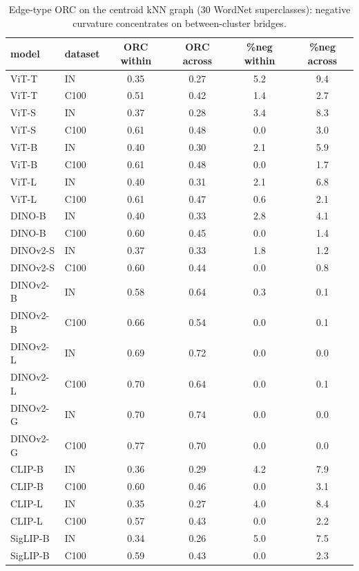 \begin{table}[H]
\centering
\small
\begin{tabular}{llcccc}
\toprule
model & dataset & ORC within & ORC across & \%neg within & \%neg across \\
\midrule
ViT-T & IN & 0.35 & 0.27 & 5.2 & 9.4 \\
ViT-T & C100 & 0.51 & 0.42 & 1.4 & 2.7 \\
ViT-S & IN & 0.37 & 0.28 & 3.4 & 8.3 \\
ViT-S & C100 & 0.61 & 0.48 & 0.0 & 3.0 \\
ViT-B & IN & 0.40 & 0.30 & 2.1 & 5.9 \\
ViT-B & C100 & 0.61 & 0.48 & 0.0 & 1.7 \\
ViT-L & IN & 0.40 & 0.31 & 2.1 & 6.8 \\
ViT-L & C100 & 0.61 & 0.47 & 0.6 & 2.1 \\
DINO-B & IN & 0.40 & 0.33 & 2.8 & 4.1 \\
DINO-B & C100 & 0.60 & 0.45 & 0.0 & 1.4 \\
DINOv2-S & IN & 0.37 & 0.33 & 1.8 & 1.2 \\
DINOv2-S & C100 & 0.60 & 0.44 & 0.0 & 0.8 \\
DINOv2-B & IN & 0.58 & 0.64 & 0.3 & 0.1 \\
DINOv2-B & C100 & 0.66 & 0.54 & 0.0 & 0.1 \\
DINOv2-L & IN & 0.69 & 0.72 & 0.0 & 0.0 \\
DINOv2-L & C100 & 0.70 & 0.64 & 0.0 & 0.1 \\
DINOv2-G & IN & 0.70 & 0.74 & 0.0 & 0.0 \\
DINOv2-G & C100 & 0.77 & 0.70 & 0.0 & 0.0 \\
CLIP-B & IN & 0.36 & 0.29 & 4.2 & 7.9 \\
CLIP-B & C100 & 0.60 & 0.46 & 0.0 & 3.1 \\
CLIP-L & IN & 0.35 & 0.27 & 4.0 & 8.4 \\
CLIP-L & C100 & 0.57 & 0.43 & 0.0 & 2.2 \\
SigLIP-B & IN & 0.34 & 0.26 & 5.0 & 7.5 \\
SigLIP-B & C100 & 0.59 & 0.43 & 0.0 & 2.3 \\
\bottomrule
\end{tabular}
\caption{Edge-type ORC on the centroid kNN graph (30 WordNet superclasses): negative curvature concentrates on between-cluster bridges.}
\label{tab:b6-bridges}
\end{table}
